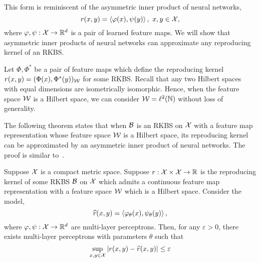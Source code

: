 This form is reminiscent of the asymmetric inner product of neural networks,
\begin{equation}
    r(x, y) = \iprod{\phi(x)}{\psi(y)}, \ x, y \in \calX,
\end{equation}
where $\varphi, \psi: {\mathcal{X}} \to \mathbb{R}^{d}$ is a pair of learned feature maps. We will show that asymmetric inner products of neural networks can approximate any reproducing kernel of an RKBS.

Let $\Phi, \Phi^*$ be a pair of feature maps which define the reproducing kernel $r(x,y) = (\Phi(x), \Phi^*(y))_{\mathcal{W}}$ for some RKBS. Recall that any two Hilbert spaces with equal dimensions are isometrically isomorphic. Hence, when the feature space ${\mathcal{W}}$ is a Hilbert space, we can consider ${\mathcal{W}} = \ell^2(\mathbb{N})$ without loss of generality. %

The following theorem states that when ${\mathcal{B}}$ is an RKBS on ${\mathcal{X}}$ with a feature map representation whose feature space ${\mathcal{W}}$ is a Hilbert space, its reproducing kernel can be approximated by an asymmetric inner product of neural networks. The proof is similar to~.

\begin{theorem}\label{thm:asymmetric_inner_prod_approximates_rkbs}
   Suppose ${\mathcal{X}}$ is a compact metric space. Suppose $r: {\mathcal{X}} \times {\mathcal{X}} \to \mathbb{R}$ is the reproducing kernel of some RKBS ${\mathcal{B}}$ on ${\mathcal{X}}$ which admits a continuous feature map representation with a feature space ${\mathcal{W}}$ which is a Hilbert space. Consider the model,
   \begin{equation}
    \hat{r}(x, y) = \iprod{\phi_\theta(x)}{\psi_\theta(y)},
   \end{equation}
    where $\varphi, \psi: {\mathcal{X}} \to \mathbb{R}^{d}$ are multi-layer perceptrons. Then, for any $\varepsilon > 0$, there exists multi-layer perceptrons with parameters $\theta$ such that
   \begin{equation*}
        \sup_{x,y \in \calX} \abs{r(x, y) - \hat{r}(x, y)} \leq \varepsilon
   \end{equation*}
\end{theorem}

